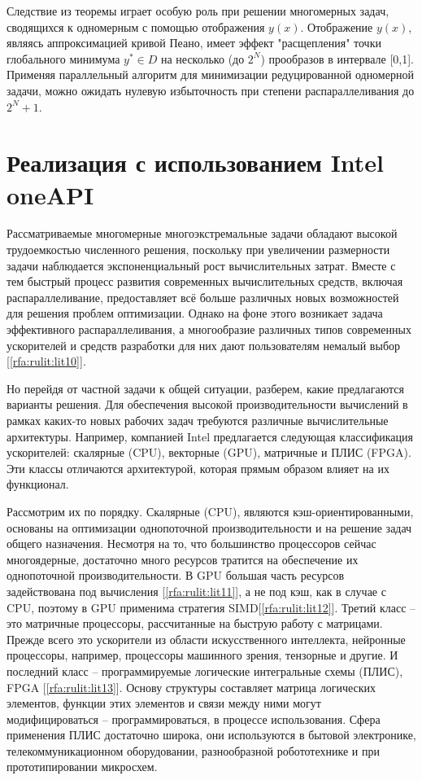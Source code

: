 \documentclass[10pt,a4paper]{book}
\begin{document}
Следствие из теоремы играет особую роль при решении многомерных задач, сводящихся к одномерным с помощью отображения $y(x)$. Отображение $y(x)$, являясь аппроксимацией кривой Пеано, имеет эффект "расщепления" точки глобального минимума $y^* \in D$ на несколько (до $2^N$) прообразов в интервале [0,1]. Применяя параллельный алгоритм для минимизации редуцированной одномерной задачи, можно ожидать нулевую избыточность при степени распараллеливания до $2^N+1$.


\section{Реализация с использованием Intel oneAPI}


Рассматриваемые многомерные многоэкстремальные задачи обладают высокой трудоемкостью численного решения, поскольку при увеличении размерности задачи наблюдается экспоненциальный рост вычислительных затрат. Вместе с тем быстрый процесс развития современных вычислительных средств, включая распараллеливание, предоставляет всё больше различных новых возможностей для решения проблем оптимизации. Однако на фоне этого возникает задача эффективного распараллеливания, а многообразие различных типов современных ускорителей и средств разработки для них дают пользователям немалый выбор [\ref{rfa:rulit:lit10}].

Но перейдя от частной задачи к общей ситуации, разберем, какие предлагаются варианты решения. Для обеспечения высокой производительности вычислений в рамках каких-то новых рабочих задач требуются различные вычислительные архитектуры. Например, компанией Intel предлагается следующая классификация ускорителей: скалярные (CPU), векторные (GPU), матричные и ПЛИС (FPGA). Эти классы отличаются архитектурой, которая прямым образом влияет на их функционал.
 
Рассмотрим их по порядку. Скалярные (CPU), являются кэш-ориентированными, основаны на оптимизации однопоточной производительности и на решение задач общего назначения. Несмотря на то, что большинство процессоров сейчас многоядерные, достаточно много ресурсов тратится на обеспечение их однопоточной производительности. В GPU большая часть ресурсов задействована под вычисления [\ref{rfa:rulit:lit11}], а не под кэш, как в случае с CPU, поэтому в GPU применима стратегия SIMD[\ref{rfa:rulit:lit12}].   Третий класс -- это матричные процессоры, рассчитанные на быструю работу с матрицами. Прежде всего это ускорители из области искусственного интеллекта, нейронные процессоры, например, процессоры машинного зрения, тензорные и другие. И последний класс -- программируемые логические интегральные схемы (ПЛИС), FPGA [\ref{rfa:rulit:lit13}]. Основу структуры составляет матрица логических элементов, функции этих элементов и связи между ними могут модифицироваться – программироваться, в процессе использования. Сфера применения ПЛИС достаточно широка, они используются в бытовой электронике, телекоммуникационном оборудовании, разнообразной робототехнике и при прототипировании микросхем.
\end{document}
